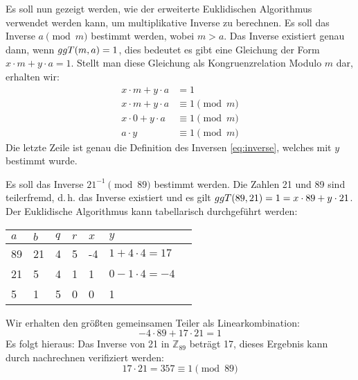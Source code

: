 \noindent
Es soll nun gezeigt werden, wie der erweiterte Euklidischen Algorithmus verwendet werden kann,
um multiplikative Inverse zu berechnen. Es soll das Inverse $a \pmod{m}$ bestimmt werden, wobei
$m > a$. Das Inverse existiert genau dann, wenn $ggT(m,a) = 1$, dies bedeutet es gibt
eine Gleichung der Form $x \cdot m + y \cdot a = 1$. Stellt man diese Gleichung
als Kongruenzrelation Modulo $m$ dar, erhalten wir:
\begin{align*}
  x \cdot m + y \cdot a & = 1               \\
  x \cdot m + y \cdot a & \equiv 1 \pmod{m} \\
  x \cdot 0 + y \cdot a & \equiv 1 \pmod{m} \\
  a \cdot y             & \equiv 1 \pmod{m}
\end{align*}
Die letzte Zeile ist genau die Definition des Inversen \eqref{eq:inverse}, welches
mit $y$ bestimmt wurde.
\begin{example}
  Es soll das Inverse $21^{-1} \pmod{89}$ bestimmt werden. Die Zahlen 21 und 89 sind
  teilerfremd, d.\,h. das Inverse existiert und es gilt
  $ggT(89,21) = 1 = x \cdot 89 + y \cdot 21$. Der Euklidische
  Algorithmus kann tabellarisch durchgeführt werden:
  \begin{center}
    \centering
    \begin{tabular}{|l|l|l|l|l|l|l|}
      \hline
      $a$ & $b$ & $q$ & $r$ & $x$ & $y$                  \\ \hline
      89  & 21  & 4   & 5   & -4  & $1 + 4 \cdot 4 = 17$ \\ \hline
      21  & 5   & 4   & 1   & 1   & $0 - 1 \cdot 4 = -4$ \\ \hline
      5   & 1   & 5   & 0   & 0   & 1                    \\ \hline
    \end{tabular}
  \end{center}
  \noindent
  Wir erhalten den größten gemeinsamen Teiler als Linearkombination:
  \begin{equation*}
    -4 \cdot 89 + 17 \cdot 21 = 1
  \end{equation*}
  Es folgt hieraus: Das Inverse von 21 in $\mathbb{Z}_{89}$ beträgt 17, dieses Ergebnis kann durch nachrechnen
  verifiziert werden:
  \begin{equation*}
    17 \cdot 21 = 357 \equiv 1 \pmod{89}
  \end{equation*}
\end{example}

